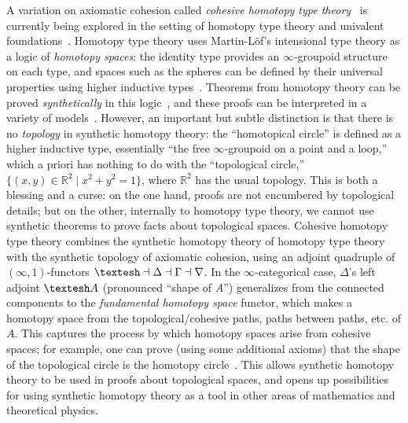 \documentclass{drl-common/llncs}
\newcommand{\la}{\ensuremath{\dashv}}
\newcommand{\sh}{\text{\textesh}}
\begin{document}
A variation on axiomatic cohesion called \emph{cohesive homotopy type
  theory}~\citep{schreiber13dcct,schreibershulman12cohesive,shulman15realcohesion}
is currently being explored in the setting of homotopy type theory and
univalent foundations~\citep{voevodsky06homotopy,uf13hott-book}.
Homotopy type theory uses Martin-L\"of's intensional type theory as a
logic of \emph{homotopy spaces}: the identity type provides an
$\infty$-groupoid structure on each type, and spaces such as the spheres
can be defined by their universal properties using higher inductive
types~\citep{lumsdaine+13hits,shulman11hitsblog,lumsdaine11hitsblog}.
Theorems from homotopy theory can be proved \emph{synthetically} in this
logic~\citep{ls13pi1s1,lb13pinsn,lf14emspace,lb15cubical,favonia14covering,cavallo14mayervietoris},
and these proofs can be interpreted in a variety of
models~\citep{shulman15inversediag,voevodsky+12simpluniv,coquand+13cubical}.
However, an important but subtle distinction is that there is no
\emph{topology} in synthetic homotopy theory: the ``homotopical circle''
is defined as a higher inductive type, essentially ``the free
$\infty$-groupoid on a point and a loop,'' which a priori has nothing to
do with the ``topological circle,'' $\{ (x,y) \in \mathbb{R}^2 \mid x^2
+ y^2 = 1\}$, where $\mathbb{R}^2$ has the usual topology.  This is both
a blessing and a curse: on the one hand, proofs are not encumbered by
topological details; but on the other, internally to homotopy type
theory, we cannot use synthetic theorems to prove facts about
topological spaces.  Cohesive homotopy type theory combines the
synthetic homotopy theory of homotopy type theory with the synthetic
topology of axiomatic cohesion, using an adjoint quadruple of
$(\infty,1)$-functors $\sh \la \Delta \la \Gamma \la \nabla$.  In the
$\infty$-categorical case, $\Delta$'s left adjoint $\sh A$ (pronounced
``shape of $A$'') generalizes from the connected components to the
\emph{fundamental homotopy space} functor, which makes a homotopy space
from the topological/cohesive paths, paths between paths, etc. of $A$.
This captures the process by which homotopy spaces arise from cohesive
spaces; for example, one can prove (using some additional axioms) that
the shape of the topological circle is the homotopy
circle~\citep{shulman15realcohesion}.  This allows synthetic homotopy
theory to be used in proofs about topological spaces, and opens up
possibilities for using synthetic homotopy theory as a tool in other
areas of mathematics and theoretical physics.
\end{document}

